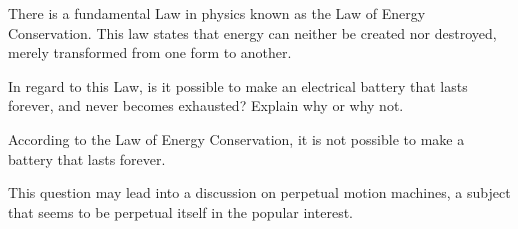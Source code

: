 

There is a fundamental Law in physics known as the Law of Energy Conservation.  This law states that energy can neither be created nor destroyed, merely transformed from one form to another.

In regard to this Law, is it possible to make an electrical battery that lasts forever, and never becomes exhausted?  Explain why or why not.







According to the Law of Energy Conservation, it is not possible to make a battery that lasts forever.







This question may lead into a discussion on perpetual motion machines, a subject that seems to be perpetual itself in the popular interest.




